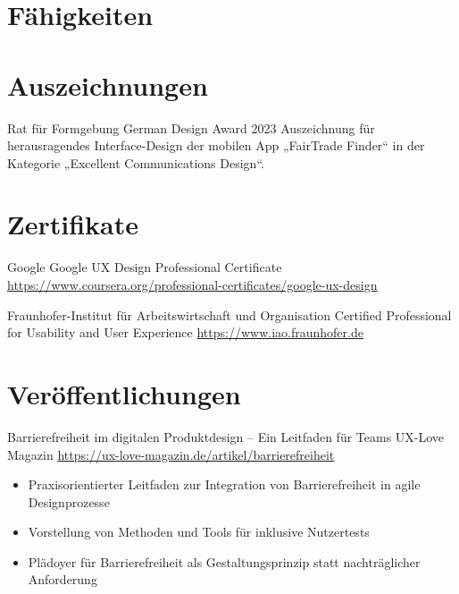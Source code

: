 \documentclass[a4paper, serif, 10pt]{moderncv}
\begin{document}
\section{Fähigkeiten}

\section{Auszeichnungen}

        {Rat für Formgebung}
        {German Design Award 2023}
        {}
        {}
        {Auszeichnung für herausragendes Interface-Design der mobilen App „FairTrade Finder“ in der Kategorie „Excellent Communications Design“.}
\section{Zertifikate}

        {Google}
        {Google UX Design Professional Certificate}
        {\url{https://www.coursera.org/professional-certificates/google-ux-design}}
        {}
        {}

        {Fraunhofer-Institut für Arbeitswirtschaft und Organisation}
        {Certified Professional for Usability and User Experience}
        {\url{https://www.iao.fraunhofer.de}}
        {}
        {}
\section{Veröffentlichungen}

        {Barrierefreiheit im digitalen Produktdesign – Ein Leitfaden für Teams}
        {UX-Love Magazin}
        {\url{https://ux-love-magazin.de/artikel/barrierefreiheit}}
        {}
        {\begin{itemize}
\item Praxisorientierter Leitfaden zur Integration von Barrierefreiheit in agile Designprozesse
\item Vorstellung von Methoden und Tools für inklusive Nutzertests
\item Plädoyer für Barrierefreiheit als Gestaltungsprinzip statt nachträglicher Anforderung
\end{itemize}}
\end{document}
